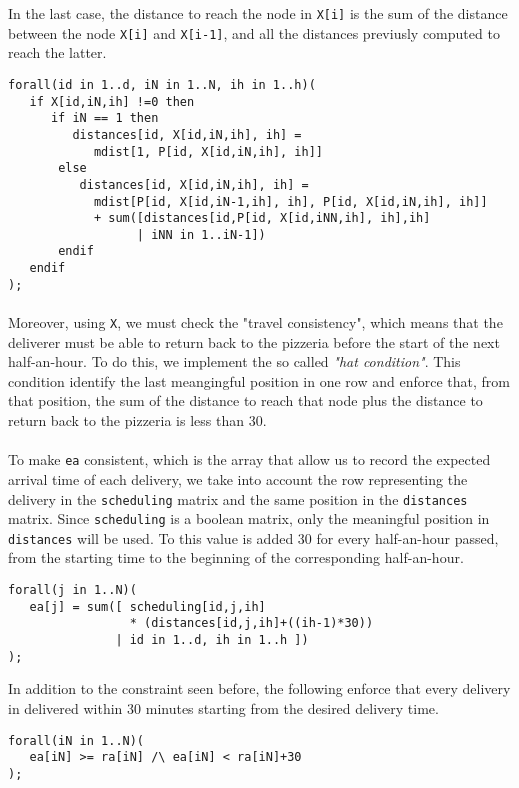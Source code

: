 \documentclass[10pt]{article}
\begin{document}
	In the last case, the distance to reach the node in \texttt{X[i]} is 
	the sum of the distance between the node \texttt{X[i]} and \texttt{X[i-1]}, and all 
	the distances previusly computed to reach the latter. 
	\begin{verbatim}
forall(id in 1..d, iN in 1..N, ih in 1..h)(
   if X[id,iN,ih] !=0 then
      if iN == 1 then
         distances[id, X[id,iN,ih], ih] = 
            mdist[1, P[id, X[id,iN,ih], ih]] 
       else
          distances[id, X[id,iN,ih], ih] = 
            mdist[P[id, X[id,iN-1,ih], ih], P[id, X[id,iN,ih], ih]] 
         	+ sum([distances[id,P[id, X[id,iNN,ih], ih],ih]
                  | iNN in 1..iN-1])
       endif
   endif
);
	\end{verbatim}

	\paragraph*{}
	Moreover, using \texttt{X}, we must check the "travel consistency", which 
	means that the deliverer must be able to return back to the pizzeria before the 
	start of the next half-an-hour. 
	To do this, we implement the so called \textit{"hat condition"}. This condition 
	identify the last meangingful position in one row and enforce that, from that position,
	the sum	of the distance to reach that node plus the distance to return back 
	to the pizzeria is less	than 30.

	\paragraph*{}
	To make \texttt{ea} consistent, which is the array that allow us to record the expected arrival
	time of each delivery, we take into account the row representing the delivery in the 
	\texttt{scheduling} matrix and the same position in the \texttt{distances} matrix. Since 
	\texttt{scheduling} is a boolean matrix, only the meaningful position in 
	\texttt{distances} will be used. To this value is added 30 for every half-an-hour passed,
	from the starting time to the beginning of the corresponding half-an-hour. 
	\begin{verbatim}
forall(j in 1..N)(
   ea[j] = sum([ scheduling[id,j,ih] 
                 * (distances[id,j,ih]+((ih-1)*30))
               | id in 1..d, ih in 1..h ])  
);
	\end{verbatim}

	In addition to the constraint seen before, the following enforce that every delivery
	in delivered within 30 minutes starting from the desired delivery time.
	\begin{verbatim}
forall(iN in 1..N)(
   ea[iN] >= ra[iN] /\ ea[iN] < ra[iN]+30 
);		  
	\end{verbatim}
\end{document}
